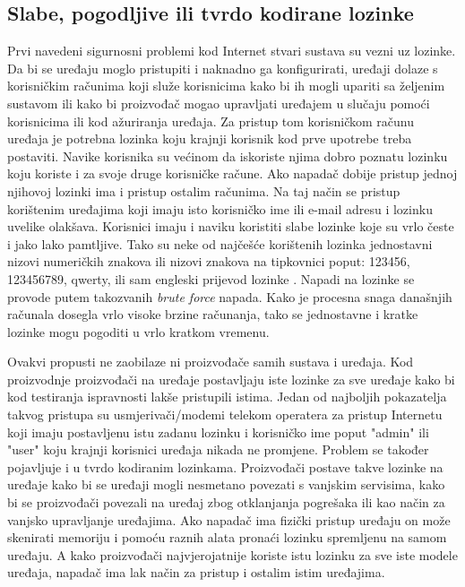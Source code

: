 \documentclass[times, utf8, diplomski]{fer}
\begin{document}
\subsection{Slabe, pogodljive ili tvrdo kodirane lozinke}
Prvi navedeni sigurnosni problemi kod Internet stvari sustava su vezni uz lozinke. Da bi se uređaju moglo pristupiti i naknadno ga konfigurirati, uređaji dolaze s korisničkim računima koji služe korisnicima kako bi ih mogli upariti sa željenim sustavom ili kako bi proizvođač mogao upravljati uređajem u slučaju pomoći korisnicima ili kod ažuriranja uređaja. Za pristup tom korisničkom računu uređaja je potrebna lozinka koju krajnji korisnik kod prve upotrebe treba postaviti. Navike korisnika su većinom da iskoriste njima dobro poznatu lozinku koju koriste i za svoje druge korisničke račune. Ako napadač dobije pristup jednoj njihovoj lozinki ima i pristup ostalim računima. Na taj način se pristup korištenim uređajima koji imaju isto korisničko ime ili e-mail adresu i lozinku uvelike olakšava. Korisnici imaju i naviku koristiti slabe lozinke koje su vrlo česte i jako lako pamtljive. Tako su neke od najčešće korištenih lozinka jednostavni nizovi numeričkih znakova ili nizovi znakova na tipkovnici poput: 123456, 123456789, qwerty, ili sam engleski prijevod lozinke \citep{pass1}. Napadi na lozinke se provode putem takozvanih \emph{brute force} napada. Kako je procesna snaga današnjih računala dosegla vrlo visoke brzine računanja, tako se jednostavne i kratke lozinke mogu pogoditi u vrlo kratkom vremenu.

Ovakvi propusti ne zaobilaze ni proizvođače samih sustava i uređaja. Kod proizvodnje proizvođači na uređaje postavljaju iste lozinke za sve uređaje kako bi kod testiranja ispravnosti lakše pristupili istima. Jedan od najboljih pokazatelja takvog pristupa su usmjerivači/modemi telekom operatera za pristup Internetu koji imaju postavljenu istu zadanu lozinku i korisničko ime poput "admin" ili "user" koju krajnji korisnici uređaja nikada ne promjene. Problem se također pojavljuje i u tvrdo kodiranim  lozinkama. Proizvođači postave takve lozinke na uređaje kako bi se uređaji mogli nesmetano povezati s vanjskim servisima, kako bi se proizvođači povezali na uređaj zbog otklanjanja pogrešaka ili kao način za vanjsko upravljanje uređajima. Ako napadač ima fizički pristup uređaju on može skenirati memoriju i pomoću raznih alata pronaći lozinku spremljenu na samom uređaju. A kako proizvođači najvjerojatnije koriste istu lozinku za sve iste modele uređaja, napadač ima lak način za pristup i ostalim istim uređajima.
\end{document}
